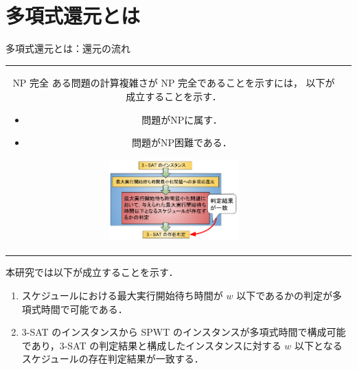 \documentclass[dvipdfmx]{beamer}
\begin{document}
\section{多項式還元とは}
\begin{frame}{多項式還元とは：還元の流れ}
  \begin{tabular}{cc}
    \begin{minipage}[c]{0.5\hsize}
      \begin{block}{NP 完全}
        ある問題の計算複雑さが NP 完全であることを示すには，
        以下が成立することを示す．
        \begin{itemize}
          \item 問題がNPに属す．
          \item 問題がNP困難である．
        \end{itemize}
      \end{block}
    \end{minipage}
    \begin{minipage}[c]{0.5\hsize}
      \begin{figure}[c]
        \centering
        \includegraphics[width=5cm,bb=0 0 360 260
        ]{figure/reduction.pdf}
      \end{figure}
    \end{minipage}
  \end{tabular}
  \begin{block}{}
    本研究では以下が成立することを示す．
    \begin{enumerate}
      \item スケジュールにおける最大実行開始待ち時間が $w$ 以下であるかの判定が\alert{多項式時間}で可能である．
      \item \textsc{3-SAT} のインスタンスから SPWT のインスタンスが\alert{多項式時間}で構成可能であり，\textsc{3-SAT} の判定結果と構成したインスタンスに対する $w$ 以下となるスケジュールの存在判定結果が\alert{一致}する．
    \end{enumerate}
  \end{block}
\end{frame}
\end{document}

